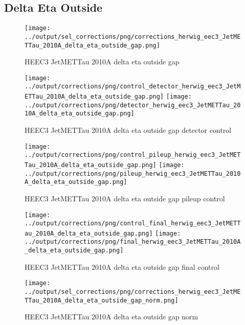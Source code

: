 \documentclass[11pt]{book}
\begin{document}
\clearpage
\subsection{Delta Eta Outside}
\begin{figure}[ht]
\centering
\texttt{[image: ../output/sel\_corrections/png/corrections\_herwig\_eec3\_JetMETTau\_2010A\_delta\_eta\_outside\_gap.png]}
\caption{HEEC3 JetMETTau 2010A delta eta outside gap}
\label{fig:HEEC3_JetMETTau_2010A_delta_eta_outside_gap}
\end{figure}

\begin{figure}[ht]
\centering
\texttt{[image: ../output/corrections/png/control\_detector\_herwig\_eec3\_JetMETTau\_2010A\_delta\_eta\_outside\_gap.png]}
\texttt{[image: ../output/corrections/png/detector\_herwig\_eec3\_JetMETTau\_2010A\_delta\_eta\_outside\_gap.png]}
\caption{HEEC3 JetMETTau 2010A delta eta outside gap detector control}
\label{fig:HEEC3_JetMETTau_2010A_delta_eta_outside_gap_detector_control}
\end{figure}

\begin{figure}[ht]
\centering
\texttt{[image: ../output/corrections/png/control\_pileup\_herwig\_eec3\_JetMETTau\_2010A\_delta\_eta\_outside\_gap.png]}
\texttt{[image: ../output/corrections/png/pileup\_herwig\_eec3\_JetMETTau\_2010A\_delta\_eta\_outside\_gap.png]}
\caption{HEEC3 JetMETTau 2010A delta eta outside gap pileup control}
\label{fig:HEEC3_JetMETTau_2010A_delta_eta_outside_gap_pileup_control}
\end{figure}


\begin{figure}[ht]
\centering
\texttt{[image: ../output/corrections/png/control\_final\_herwig\_eec3\_JetMETTau\_2010A\_delta\_eta\_outside\_gap.png]}
\texttt{[image: ../output/corrections/png/final\_herwig\_eec3\_JetMETTau\_2010A\_delta\_eta\_outside\_gap.png]}
\caption{HEEC3 JetMETTau 2010A delta eta outside gap final control}
\label{fig:HEEC3_JetMETTau_2010A_delta_eta_outside_gap_final_control}
\end{figure}



\begin{figure}[ht]
\centering
\texttt{[image: ../output/sel\_corrections/png/corrections\_herwig\_eec3\_JetMETTau\_2010A\_delta\_eta\_outside\_gap\_norm.png]}
\caption{HEEC3 JetMETTau 2010A delta eta outside gap norm}
\label{fig:HEEC3_JetMETTau_2010A_delta_eta_outside_gap_norm}
\end{figure}
\end{document}
